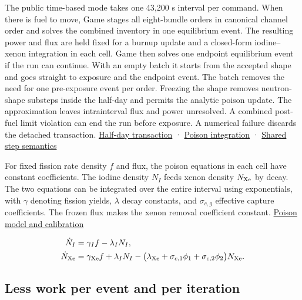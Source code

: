 \documentclass[11pt,letterpaper]{article}
\begin{document}
The public time-based mode takes one 43,200 s interval per command. When there is fuel
to move, Game stages all eight-bundle orders in canonical channel order and solves the
combined inventory in one equilibrium event. The resulting power and flux are held fixed
for a burnup update and a closed-form iodine--xenon integration in each cell. Game then
solves one endpoint equilibrium event if the run can continue. With an empty batch it
starts from the accepted shape and goes straight to exposure and the endpoint event. The
batch removes the need for one pre-exposure event per order. Freezing the shape removes
neutron-shape substeps inside the half-day and permits the analytic poison update. The
approximation leaves intrainterval flux and power unresolved. A combined post-fuel limit
violation can end the run before exposure. A numerical failure discards the detached
transaction.
\href{https://github.com/hkkho/CRS/blob/4341ae8881f5827988c3d8b1859aa9e8f13cd8a6/src/ReactorSim.Game/GameSession.cs\#L147}{Half-day
transaction} ·
\href{https://github.com/hkkho/CRS/blob/4341ae8881f5827988c3d8b1859aa9e8f13cd8a6/src/ReactorSim.Core/Domain/PracticeXenonContracts.cs\#L27}{Poison
integration} ·
\href{https://github.com/hkkho/CRS/blob/4341ae8881f5827988c3d8b1859aa9e8f13cd8a6/docs/gameplay/daily-turn-mode.md}{Shared
step semantics}

For fixed fission rate density \(f\) and flux, the poison equations in each cell have
constant coefficients. The iodine density \(N_I\) feeds xenon density \(N_{\rm Xe}\) by
decay. The two equations can be integrated over the entire interval using exponentials,
with \(\gamma\) denoting fission yields, \(\lambda\) decay constants, and
\(\sigma_{c,g}\) effective capture coefficients. The frozen flux makes the xenon removal
coefficient constant.
\href{https://github.com/hkkho/CRS/blob/4341ae8881f5827988c3d8b1859aa9e8f13cd8a6/docs/physics/xenon-calibration.md}{Poison
model and calibration}

\begin{equation}
\label{eq:poison}
\begin{aligned}
\dot N_I &= \gamma_I f-\lambda_I N_I,\\
\dot N_{\rm Xe} &= \gamma_{\rm Xe} f+\lambda_I N_I
-\big(\lambda_{\rm Xe}+\sigma_{c,1}\phi_1+\sigma_{c,2}\phi_2\big)N_{\rm Xe}.
\end{aligned}
\end{equation}

\subsection{Less work per event and per
iteration}\label{less-work-per-event-and-per-iteration}
\end{document}
